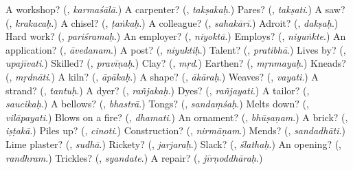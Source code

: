 \begin{tcolorbox}[breakable,colback=teal!4,colframe=teal!35!black,title={Before you move on}]
A workshop? (\textbf{}, \emph{karmaśālā}.) A carpenter? (\textbf{}, \emph{takṣakaḥ}.) Pares? (\textbf{}, \emph{takṣati}.) A saw? (\textbf{}, \emph{krakacaḥ}.) A chisel? (\textbf{}, \emph{ṭaṅkaḥ}.) A colleague? (\textbf{}, \emph{sahakārī}.) Adroit? (\textbf{}, \emph{dakṣaḥ}.) Hard work? (\textbf{}, \emph{pariśramaḥ}.) An employer? (\textbf{}, \emph{niyoktā}.) Employs? (\textbf{}, \emph{niyuṅkte}.) An application? (\textbf{}, \emph{āvedanam}.) A post? (\textbf{}, \emph{niyuktiḥ}.) Talent? (\textbf{}, \emph{pratibhā}.) Lives by? (\textbf{}, \emph{upajīvati}.) Skilled? (\textbf{}, \emph{pravīṇaḥ}.) Clay? (\textbf{}, \emph{mṛd}.) Earthen? (\textbf{}, \emph{mṛnmayaḥ}.) Kneads? (\textbf{}, \emph{mṛdnāti}.) A kiln? (\textbf{}, \emph{āpākaḥ}.) A shape? (\textbf{}, \emph{ākāraḥ}.) Weaves? (\textbf{}, \emph{vayati}.) A strand? (\textbf{}, \emph{tantuḥ}.) A dyer? (\textbf{}, \emph{rañjakaḥ}.) Dyes? (\textbf{}, \emph{rañjayati}.) A tailor? (\textbf{}, \emph{saucikaḥ}.) A bellows? (\textbf{}, \emph{bhastrā}.) Tongs? (\textbf{}, \emph{sandaṃśaḥ}.) Melts down? (\textbf{}, \emph{vilāpayati}.) Blows on a fire? (\textbf{}, \emph{dhamati}.) An ornament? (\textbf{}, \emph{bhūṣaṇam}.) A brick? (\textbf{}, \emph{iṣṭakā}.) Piles up? (\textbf{}, \emph{cinoti}.) Construction? (\textbf{}, \emph{nirmāṇam}.) Mends? (\textbf{}, \emph{sandadhāti}.) Lime plaster? (\textbf{}, \emph{sudhā}.) Rickety? (\textbf{}, \emph{jarjaraḥ}.) Slack? (\textbf{}, \emph{ślathaḥ}.) An opening? (\textbf{}, \emph{randhram}.) Trickles? (\textbf{}, \emph{syandate}.) A repair? (\textbf{}, \emph{jīrṇoddhāraḥ}.)
\end{tcolorbox}
